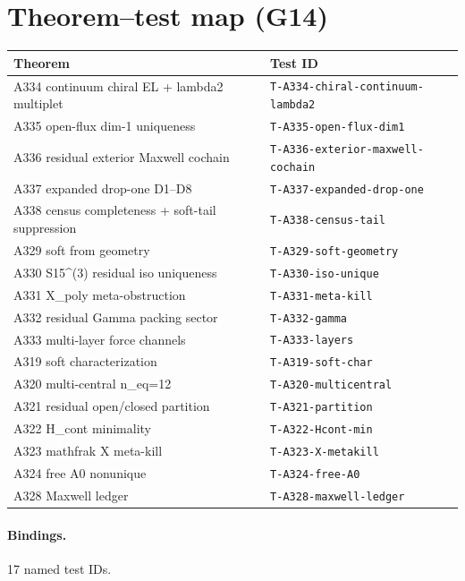 \documentclass[11pt,a4paper]{article}
\begin{document}
\section{Theorem--test map (G14)}
\begin{center}
\begin{tabular}{@{}p{6.4cm}p{5.4cm}@{}}
\toprule Theorem & Test ID \\
\midrule
A334 continuum chiral EL + lambda2 multiplet & \texttt{T-A334-chiral-continuum-lambda2} \\
A335 open-flux dim-1 uniqueness & \texttt{T-A335-open-flux-dim1} \\
A336 residual exterior Maxwell cochain & \texttt{T-A336-exterior-maxwell-cochain} \\
A337 expanded drop-one D1–D8 & \texttt{T-A337-expanded-drop-one} \\
A338 census completeness + soft-tail suppression & \texttt{T-A338-census-tail} \\
A329 soft from geometry & \texttt{T-A329-soft-geometry} \\
A330 S15^(3) residual iso uniqueness & \texttt{T-A330-iso-unique} \\
A331 X_poly meta-obstruction & \texttt{T-A331-meta-kill} \\
A332 residual Gamma packing sector & \texttt{T-A332-gamma} \\
A333 multi-layer force channels & \texttt{T-A333-layers} \\
A319 soft characterization & \texttt{T-A319-soft-char} \\
A320 multi-central n_eq=12 & \texttt{T-A320-multicentral} \\
A321 residual open/closed partition & \texttt{T-A321-partition} \\
A322 H_cont minimality & \texttt{T-A322-Hcont-min} \\
A323 mathfrak X meta-kill & \texttt{T-A323-X-metakill} \\
A324 free A0 nonunique & \texttt{T-A324-free-A0} \\
A328 Maxwell ledger & \texttt{T-A328-maxwell-ledger} \\
\bottomrule
\end{tabular}
\end{center}

\paragraph{Bindings.} 17 named test IDs.
\end{document}
